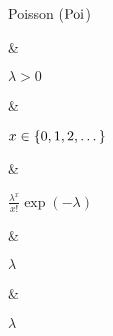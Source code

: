 Poisson ($\operatorname{Poi}$)

&

$\lambda > 0$

& 

$x \in \mathbb \{0, 1, 2, \dotsc\}$

&

\(\displaystyle
	\frac{\lambda^x}{x!} \exp(-\lambda)
\)

& 

$\lambda$

&

$\lambda$